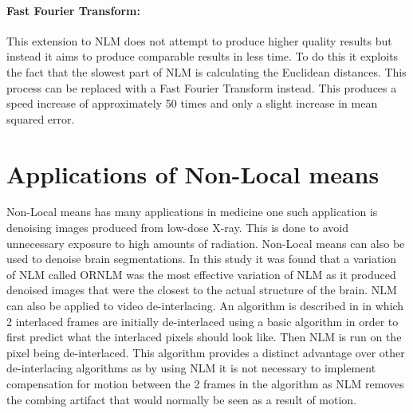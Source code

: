 \documentclass[11pt,letterpaper]{article}
\begin{document}
\paragraph{Fast Fourier Transform:}
This extension to NLM does not attempt to produce higher quality results but instead it aims to produce comparable results in less time. To do this it exploits the fact that the slowest part of NLM is calculating the Euclidean distances\cite{paper8}. This process can be replaced with a Fast Fourier Transform instead. This produces a speed increase of approximately 50 times and only a slight increase in mean squared error\cite{paper8}.
\section*{Applications of Non-Local means}
Non-Local means has many applications in medicine one such application is denoising images produced from low-dose X-ray\cite{paper9}. This is done to avoid unnecessary exposure to high amounts of radiation. Non-Local means can also be used to denoise brain segmentations\cite{paper10}. In this study it was found that a variation of NLM called ORNLM was the most effective variation of NLM as it produced denoised images that were the closest to the actual structure of the brain\cite{paper10}. NLM can also be applied to video de-interlacing. An algorithm is described in\cite{paper11} in which 2 interlaced frames are initially de-interlaced using a basic algorithm in order to first predict what the interlaced pixels should look like. Then NLM is run on the pixel being de-interlaced. This algorithm provides a distinct advantage over other de-interlacing algorithms as by using NLM it is not necessary to implement compensation for motion between the 2 frames in the algorithm as NLM removes the combing artifact that would normally be seen as a result of motion\cite{paper11}.
\end{document}
